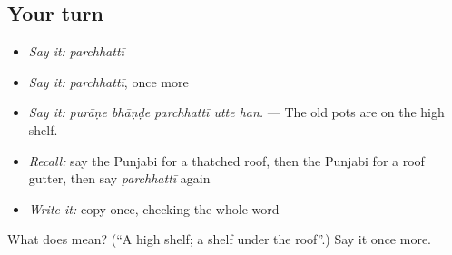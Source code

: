 \subsection*{Your turn}
\begin{itemize}
\raggedright
  \item \emph{Say it:} \emph{parchhattī}
  \item \emph{Say it:} \emph{parchhattī}, once more
  \item \emph{Say it:} \emph{purāṇe bhāṇḍe parchhattī utte han.} — The old pots are on the high shelf.
  \item \emph{Recall:} say the Punjabi for a thatched roof, then the Punjabi for a roof gutter, then say \emph{parchhattī} again
  \item \emph{Write it:} copy \textbf{} once, checking the whole word
\end{itemize}

\begin{tcolorbox}[breakable,colback=teal!4,colframe=teal!35!black,title={Before you move on}]
What does  mean? (\textquotedblleft{}A high shelf; a shelf under the roof\textquotedblright{}.) Say it once more.
\end{tcolorbox}
